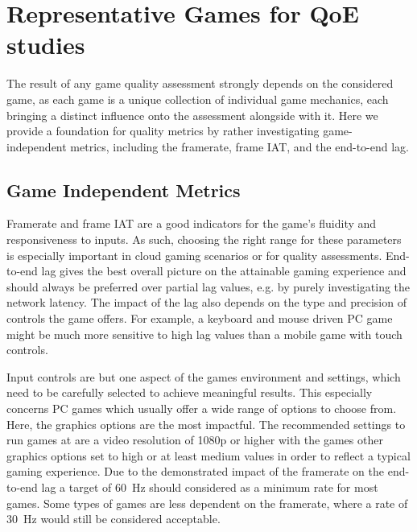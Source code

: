 \section{Representative Games for QoE studies}
\label{sec:game-criteria}

The result of any game quality assessment strongly depends on the considered game, as each game is a unique collection of individual game mechanics, each bringing a distinct influence onto the assessment alongside with it. Here we provide a foundation for quality metrics by rather investigating game-independent metrics, including the framerate, frame \gls{IAT}, and the end-to-end lag.


\subsection{Game Independent Metrics}
Framerate and frame \gls{IAT} are a good indicators for the game's fluidity and responsiveness to inputs.
As such, choosing the right range for these parameters is especially important in cloud gaming scenarios or for quality assessments.
End-to-end lag gives the best overall picture on the attainable gaming experience and should always be preferred over partial lag values, e.g. by purely investigating the network latency.
The impact of the lag also depends on the type and precision of controls the game offers.
For example, a keyboard and mouse driven PC game might be much more sensitive to high lag values than a mobile game with touch controls.

Input controls are but one aspect of the games environment and settings, which need to be carefully selected to achieve meaningful results.
This especially concerns PC games which usually offer a wide range of options to choose from.
Here, the graphics options are the most impactful.
The recommended settings to run games at are a video resolution of 1080p or higher with the games other graphics options set to high or at least medium values in order to reflect a typical gaming experience. 
Due to the demonstrated impact of the framerate on the end-to-end lag a target of \SI{60}{\hertz} should considered as a minimum rate for most games.
Some types of games are less dependent on the framerate, where a rate of \SI{30}{\hertz} would still be considered acceptable. 

